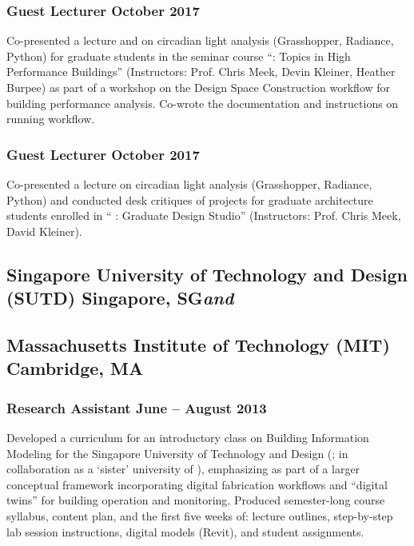 \documentclass[letterpaper, oneside, 10pt]{article}
\begin{document}
\subsubsection*{Guest Lecturer\DotSep{0.25em} October 2017}

Co-presented a lecture and on circadian light analysis (Grasshopper, Radiance,
Python) for graduate students in the seminar course ``:
Topics in High Performance Buildings'' (Instructors: Prof. Chris Meek, Devin
Kleiner, Heather Burpee) as part of a workshop on the Design Space
Construction  workflow for building performance analysis. Co-wrote
the documentation and instructions on running  workflow.


\subsubsection*{Guest Lecturer\DotSep{0.25em} October 2017}

Co-presented a lecture on circadian light analysis (Grasshopper, Radiance,
Python) and conducted desk critiques of projects for graduate architecture
students enrolled in `` : Graduate Design Studio''
(Instructors: Prof. Chris Meek, David Kleiner).


\subsection*{%
  Singapore University of Technology and Design (SUTD)%
  \DotSep{0.25em} Singapore, SG\DotSep{0.25em}\textit{and}%
}
\subsection*{%
  Massachusetts Institute of Technology (MIT)\DotSep{0.25em} Cambridge, MA%
}

\subsubsection*{Research Assistant\DotSep{0.25em} June -- August 2013}

Developed a curriculum for an introductory class on Building Information
Modeling  for the Singapore University of Technology and Design
(; in collaboration as a `sister' university of ), emphasizing
 as part of a larger conceptual framework incorporating digital
fabrication workflows and ``digital twins'' for building operation and
monitoring. Produced semester-long course syllabus, content plan, and the
first five weeks of: lecture outlines, step-by-step lab session instructions,
digital models (Revit), and student assignments.
\end{document}
